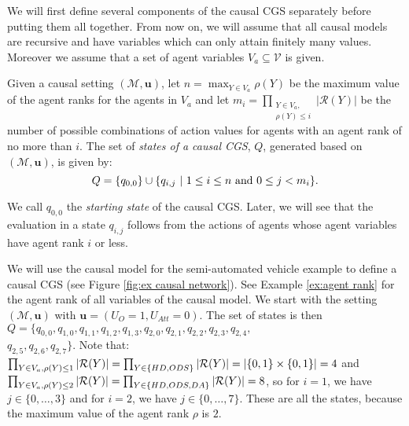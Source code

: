 We will first define several components of the causal CGS separately before putting them all together.
From now on, we will assume that all causal models are recursive and have variables which can only attain finitely many values. Moreover we assume that a set of agent variables $V_a \subseteq \mathcal{V}$ is given. 

\begin{definition}\label{def:states causal CGS}
Given a causal setting $(\mathcal{M},\mathbf{u})$, let $n = \max_{Y\in V_a} \rho(Y)$ be the maximum value of the agent ranks for the agents in $V_a$ and let $m_i = \prod_{\substack{Y \in V_a,\\ \rho(Y) \leq i}} |\mathcal{R}(Y)|$  be the number of possible combinations of action values for agents with an agent rank of no more than $i$. 
The set of \emph{states of a causal CGS}, $Q$, generated based on  $(\mathcal{M},\mathbf{u})$, is given by:
    \begin{equation*}
        Q = \{ {q_{0,0}} \} \cup \{ {q_{i,j}\ |\ 1 \leq i \leq n \text{ and }  0 \leq j < m_i } \}.
    \end{equation*}
\end{definition}
We call $q_{0,0}$ the \emph{starting state} of the causal CGS.
Later, we will see that the evaluation in a state $q_{i,j}$ follows from the actions of agents whose agent variables have agent rank $i$ or less.
\begin{example}\label{ex:states causal CGS}
    We will use the causal model for the semi-automated vehicle example to define a causal CGS (see Figure \ref{fig:ex causal network}). 
    See Example \ref{ex:agent rank} for the agent rank of all variables of the causal model.
    We start with the setting $(\mathcal{M},\mathbf{u})$ with $\mathbf{u} = (U_{O} = 1,U_{Att} = 0)$.
    The set of states is then
    $Q = \{q_{0,0},q_{1,0},q_{1,1}, q_{1,2},q_{1,3},q_{2,0},q_{2,1},q_{2,2},q_{2,3},q_{2,4},$\\$q_{2,5},q_{2,6},q_{2,7}\}.$
    Note that: \newline
    $\prod_{Y \in V_a, \rho(Y) \leq 1} |\mathcal{R}(Y)| = \prod_{Y \in \{ {HD,ODS} \}} |\mathcal{R}(Y)| = |\{ {0,1} \}\times \{ {0,1} \}| = 4$ and
    $\prod_{Y \in V_a, \rho(Y) \leq 2} |\mathcal{R}(Y)| = \prod_{Y \in \{ {HD, ODS, DA} \}} |\mathcal{R}(Y)|  = 8$, so for $i = 1$, we have $j \in \{0,\ldots,3\}$ and for $i = 2$, we have $j \in \{0,\ldots,7\}$.
    These are all the states, because the maximum value of the agent rank $\rho$ is $2$.
\end{example}

